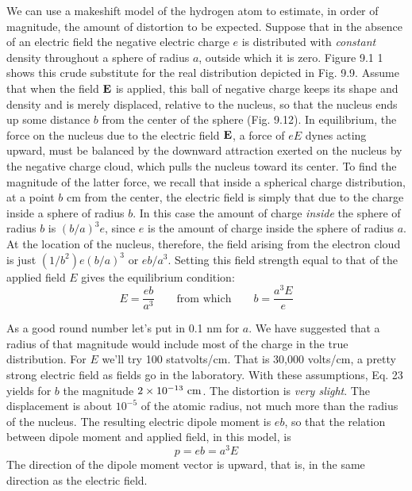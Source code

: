 We can use a makeshift model of the hydrogen atom to estimate,
in order of magnitude, the amount of distortion to be expected.
Suppose that in the absence of an electric field the negative electric
charge $e$ is distributed with \emph{constant} density throughout a sphere of
radius $a$, outside which it is zero. Figure 9.1 1 shows this crude substitute
for the real distribution depicted in Fig. 9.9. Assume that
when the field $\mathbf{E}$ is applied, this ball of negative charge keeps its shape
and density and is merely displaced, relative to the nucleus, so that
the nucleus ends up some distance $b$ from the center of the sphere
(Fig. 9.12). In equilibrium, the force on the nucleus due to the electric
field $\mathbf{E}$, a force of $eE$ dynes acting upward, must be balanced by
the downward attraction exerted on the nucleus by the negative
charge cloud, which pulls the nucleus toward its center. To find the
magnitude of the latter force, we recall that inside a spherical charge
distribution, at a point $b$ cm from the center, the electric field is
simply that due to the charge inside a sphere of radius $b$. In this case
the amount of charge \emph{inside} the sphere of radius $b$ is $(b/a)^3e$, since $e$
is the amount of charge inside the sphere of radius $a$. At the location
of the nucleus, therefore, the field arising from the electron cloud is
just $(1/b^2)e(b/a)^3$ or $eb/a^3$. Setting this field strength equal to that
of the applied field $E$ gives the equilibrium condition:
\begin{equation}
  E = \frac{eb}{a^3} \qquad \text{from which} \qquad b=\frac{a^3E}{e}
\end{equation}


As a good round number let's put in 0.1 nm for $a$.
We have suggested that a radius of that magnitude would include
most of the charge in the true distribution. For $E$ we'll try 100 
statvolts/cm. That is 30,000 volts/cm, a pretty strong electric field as
fields go in the laboratory. With these assumptions, Eq. 23 yields
for $b$ the magnitude $2 \times10^{-13}\ \cmunit$.
The distortion is \emph{very slight}. The
displacement is about $10^{-5}$ of the atomic radius, not much more than
the radius of the nucleus. The resulting electric dipole moment is $eb$,
so that the relation between dipole moment and applied field, in this
model, is
\begin{equation}
  p = eb = a^3E
\end{equation}
The direction of the dipole moment vector is upward, that is, in the
same direction as the electric field.


